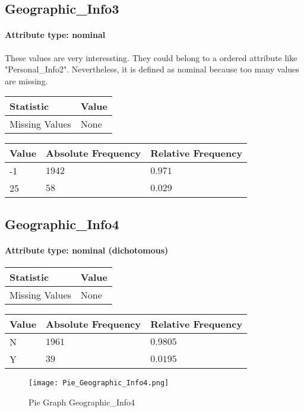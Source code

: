 \subsection{Geographic\_Info3}
\paragraph{Attribute type: nominal} These values are very interessting. They could belong to a ordered attribute like "Personal\_Info2". Nevertheless, it is defined as nominal because too many values are missing.

\begin{table}[H]
	\renewcommand{\arraystretch}{1.25}
	\begin{tabular}{l|l}
		\textbf{Statistic} & \textbf{Value}\\\hline
		Missing Values& None\\\hline
	\end{tabular}
\end{table}
\begin{table}[H]
	\renewcommand{\arraystretch}{1.25}
	\begin{tabular}{l|l|l}
		\textbf{Value} & \textbf{Absolute Frequency} & \textbf{Relative Frequency}\\\hline
		-1&$1942$&$0.971$\\\hline
		25&$58$&$0.029$
	\end{tabular}
\end{table}

\subsection{Geographic\_Info4}
\paragraph{Attribute type: nominal (dichotomous)}\quad

\begin{table}[H]
	\renewcommand{\arraystretch}{1.25}
	\begin{tabular}{l|l}
		\textbf{Statistic} & \textbf{Value}\\\hline
		Missing Values& None\\\hline
	\end{tabular}
\end{table}
\begin{table}[H]
	\renewcommand{\arraystretch}{1.25}
	\begin{tabular}{l|l|l}
		\textbf{Value} & \textbf{Absolute Frequency} & \textbf{Relative Frequency}\\\hline
		N&$1961$&$0.9805$\\\hline
		Y&$39$&$0.0195$
	\end{tabular}
\end{table}
\begin{figure}[H]
	\begin{center}
		\texttt{[image: Pie\_Geographic\_Info4.png]}
	\end{center}
	\caption{Pie Graph Geographic\_Info4}
\end{figure}


